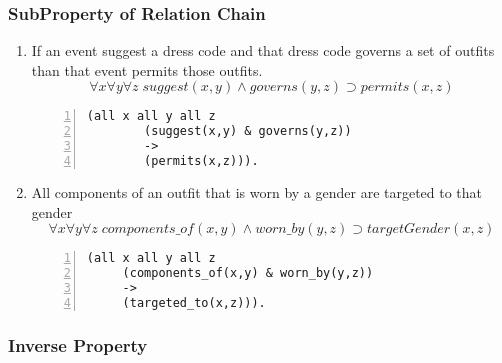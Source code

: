\documentclass[paper=a4, fontsize=11pt]{scrartcl} %
\numberwithin{equation}{section} %
\numberwithin{figure}{section} %
\numberwithin{table}{section} %
\begin{document}
\subsubsection{SubProperty of Relation Chain}
\begin{enumerate}
	
	\item If an event suggest a dress code and that dress code governs a set of outfits than that event permits those outfits.
	\begin{equation*}
		\forall x \forall y \forall z \; suggest(x,y) \land governs(y,z) \supset permits(x,z)
	\end{equation*}
	\begin{Verbatim}[frame=lines,gobble=2,numbers=left]
		(all x all y all z 
		(suggest(x,y) & governs(y,z))
		->
		(permits(x,z))).
	\end{Verbatim}

	
	\item All components of an outfit that is worn by a gender are targeted to that gender 
	\begin{equation*}
		\forall x \forall y \forall z \; components\_of(x,y) \land worn\_by(y,z) \supset targetGender(x,z)
	\end{equation*}
	\begin{Verbatim}[frame=lines,gobble=2,numbers=left]
	 (all x all y all z 
	 (components_of(x,y) & worn_by(y,z))
	 ->
	 (targeted_to(x,z))). 
	\end{Verbatim}
	
	\end{enumerate}

\subsubsection{Inverse Property}
\end{document}
